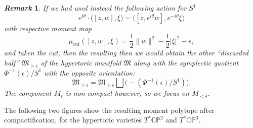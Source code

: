 \documentclass{article}
\newtheorem{remark}{\it Remark\/}
\newcommand{\m}{\mu}
\newcommand{\e}{\epsilon}
\newcommand{\PP}{\mathbb{P}}
\newcommand{\CC}{\mathbb{C}}
\newcommand{\mf}[1]{\mathfrak{#1}}
\begin{document}
	\begin{remark}
		If we had used instead the following action for $S^{1}$
		\begin{equation*}
			e^{i\theta}\cdot \big( [z,w], \xi \big) = \big( [z,e^{i\theta}w], e^{-i\theta}\xi \big)
		\end{equation*}
		with respective moment map
		\begin{equation*}
			\m_{\text{cut}} ([z,w],\xi) = \frac{1}{2}\|w\|^{2} - \frac{1}{2}|\xi|^{2} - \e,
		\end{equation*}
		and taken the cut, then the resulting then we would obtain the other ``discarded half'' $\mf{M}_{>\e}$ of the hypertoric manifold $\mf{M}$ along with the symplectic quotient $\Phi^{-1}(\e)/S^{1}$ with the opposite orientation:
		\begin{equation*}
			\mf{M}_{\geq \e} = \mf{M}_{> \e} \bigsqcup \Big(-(\Phi^{-1}(\e)/S^{1})\Big).
		\end{equation*}
		The component $M_{\e}$ is non-compact however, so we focus on $M_{<\e}$.
	\end{remark}
	
	The following two figures show the resulting moment polytope after compactification, for the hypertoric varieties $T^{\ast}\CC\PP^{2}$ and $T^{\ast}\CC\PP^{3}$.

	

	
	
	
	
	
	
	
	
	
	
	
	
	
	
	
	
	
	
	
	
	
	
	  
	
	
\end{document}
